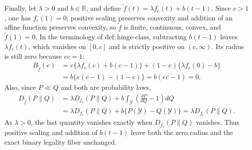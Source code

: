 Finally, let \(\lambda>0\) and \(b\in\mathbb R\), and define
\(\widetilde f(t)=\lambda f_c(t)+b(t-1)\).  Since \(c>1\), one has
\(f_c(1)=0\); positive scaling preserves convexity and addition of an affine
function preserves convexity, so \(\widetilde f\) is finite, continuous,
convex, and \(\widetilde f(1)=0\).  In the terminology of
\(\mathrm{def:hinge\text{-}class}\), subtracting \(b(t-1)\) leaves
\(\lambda f_c(t)\), which vanishes on \([0,c]\) and is strictly positive on
\((c,\infty)\).  Its radius is still zero because \(ec=1\):
\[
\begin{aligned}
B_{\widetilde f}(e)
&=e\{\lambda f_c(c)+b(c-1)\}
 +(1-e)\{\lambda f_c(0)-b\}\\
&=b\{e(c-1)-(1-e)\}=b(ec-1)=0.
\end{aligned}
\]
Also, since \(P\ll Q\) and both are probability laws,
\[
\begin{aligned}
D_{\widetilde f}(P\|Q)
&=\lambda D_{f_c}(P\|Q)
 +b\int_{\mathcal Y}\left(\frac{dP}{dQ}-1\right)dQ\\
&=\lambda D_{f_c}(P\|Q)+b\{P(\mathcal Y)-Q(\mathcal Y)\}
=\lambda D_{f_c}(P\|Q).
\end{aligned}
\]
As \(\lambda>0\), the last quantity vanishes exactly when
\(D_{f_c}(P\|Q)\) vanishes.  Thus positive scaling and addition of
\(b(t-1)\) leave both the zero radius and the exact binary legality fiber
unchanged.